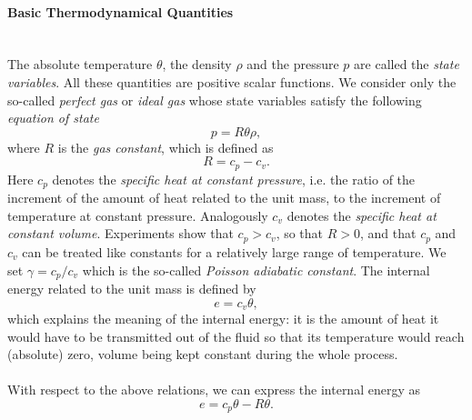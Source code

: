 \paragraph{Basic Thermodynamical Quantities}\ \\
The absolute temperature $\theta$, the density $\rho$ and the pressure $p$ are called the \textit{state variables}. All these quantities are positive scalar functions. We consider only the so-called \textit{perfect gas} or \textit{ideal gas} whose state variables satisfy the following \textit{equation of state}
\begin{equation}\label{start_therm}
p = R\theta\rho,
\end{equation}
where $R$ is the \textit{gas constant}, which is defined as 
\begin{equation}
R = c_p - c_v.
\end{equation}
Here $c_p$ denotes the \textit{specific heat at constant pressure}, i.e. the ratio of the increment of the amount of heat related to the unit mass, to the increment of temperature at constant pressure. Analogously $c_v$ denotes the \textit{specific heat at constant volume}. Experiments show that $c_p>{c_v}$, so that $R>0$, and that $c_p$ and $c_v$ can be treated like constants for a relatively large range of temperature. We set $\gamma = c_p / c_v$ which is the so-called \emph{Poisson adiabatic constant}. The internal energy related to the unit mass is defined by 
\begin{equation}\label{internal_theta}
 e = c_v\theta,
\end{equation}
which explains the meaning of the internal energy: it is the amount of heat it would have to be transmitted out of the fluid so that its temperature would reach (absolute) zero, volume being kept constant during the whole process.
\paragraph{}
With respect to the above relations, we can express the internal energy as
\begin{equation}\label{end_therm}
e = c_p\theta - R\theta.
\end{equation}

